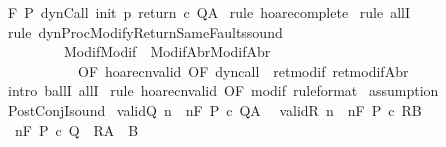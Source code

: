 \begin{isabellebody}
\ {\isachardoublequoteopen}{\isasymGamma}{\isacharcomma}{\isasymTheta}{\isasymturnstile}\isactrlbsub {\isacharslash}F\isactrlesub \ P\ {\isacharparenleft}dynCall\ init\ p\ return\ c{\isacharparenright}\ Q{\isacharcomma}A{\isachardoublequoteclose}\isanewline
%
\isadelimproof
%
\endisadelimproof
%
\isatagproof
{}\isamarkupfalse%
\ {\isacharparenleft}rule\ hoare{\isacharunderscore}complete{\isacharprime}{\isacharparenright}\isanewline
{}\isamarkupfalse%
\ {\isacharparenleft}rule\ allI{\isacharparenright}\isanewline
{}\isamarkupfalse%
\ {\isacharparenleft}rule\ dynProcModifyReturnSameFaults{\isacharunderscore}sound\ \isanewline
\ \ \ \ \ \ \ \ {\isacharbrackleft}\ Modif{\isacharequal}Modif\ \ ModifAbr{\isacharequal}ModifAbr{\isacharcomma}\isanewline
\ \ \ \ \ \ \ \ \ \ \ OF\ hoare{\isacharunderscore}cnvalid\ {\isacharbrackleft}OF\ dyn{\isacharunderscore}call{\isacharbrackright}\ {\isacharunderscore}\ ret{\isacharunderscore}modif\ ret{\isacharunderscore}modifAbr{\isacharbrackright}{\isacharparenright}\isanewline
{}\isamarkupfalse%
\ {\isacharparenleft}intro\ ballI\ allI{\isacharparenright}\isanewline
{}\isamarkupfalse%
\ {\isacharparenleft}rule\ hoare{\isacharunderscore}cnvalid\ {\isacharbrackleft}OF\ modif\ {\isacharbrackleft}rule{\isacharunderscore}format{\isacharbrackright}{\isacharbrackright}{\isacharparenright}\isanewline
{}\isamarkupfalse%
\ assumption\isanewline
{}\isamarkupfalse%
%
\endisatagproof
{\isafoldproof}%
%
\isadelimproof
%
\endisadelimproof
%
\isamarkuptrue%
\isamarkupfalse%
\ PostConjI{\isacharunderscore}sound{\isacharcolon}\isanewline
{}\ valid{\isacharunderscore}Q{\isacharcolon}\ {\isachardoublequoteopen}{\isasymforall}n{\isachardot}\ {\isasymGamma}{\isacharcomma}{\isasymTheta}\ {\isasymTurnstile}n{\isacharcolon}\isactrlbsub {\isacharslash}F\isactrlesub \ P\ c\ Q{\isacharcomma}A{\isachardoublequoteclose}\ \isanewline
{}\ valid{\isacharunderscore}R{\isacharcolon}\ {\isachardoublequoteopen}{\isasymforall}n{\isachardot}\ {\isasymGamma}{\isacharcomma}{\isasymTheta}\ {\isasymTurnstile}n{\isacharcolon}\isactrlbsub {\isacharslash}F\isactrlesub \ P\ c\ R{\isacharcomma}B{\isachardoublequoteclose}\isanewline
{}\ {\isachardoublequoteopen}{\isasymGamma}{\isacharcomma}{\isasymTheta}\ {\isasymTurnstile}n{\isacharcolon}\isactrlbsub {\isacharslash}F\isactrlesub \ P\ c\ {\isacharparenleft}Q\ {\isasyminter}\ R{\isacharparenright}{\isacharcomma}{\isacharparenleft}A\ {\isasyminter}\ B{\isacharparenright}{\isachardoublequoteclose}\isanewline

\end{isabellebody}
